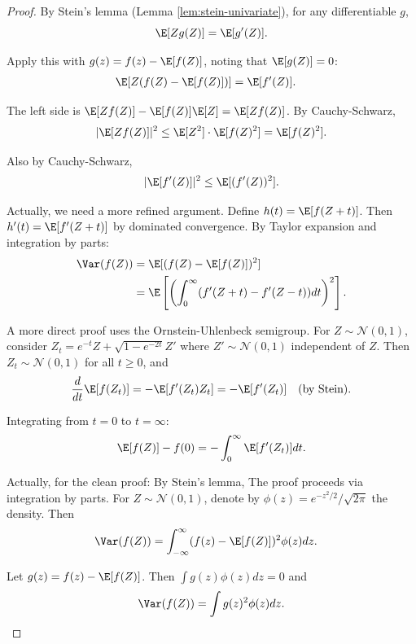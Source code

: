 \begin{proof}
By Stein's lemma (Lemma \ref{lem:stein-univariate}), for any differentiable $g$,
\[
\E[Z g(Z)] = \E[g'(Z)].
\]

Apply this with $g(z) = f(z) - \E[f(Z)]$, noting that $\E[g(Z)] = 0$:
\begin{align}
\E[Z(f(Z) - \E[f(Z)])] &= \E[f'(Z)].
\end{align}

The left side is $\E[Z f(Z)] - \E[f(Z)]\E[Z] = \E[Z f(Z)]$. By Cauchy-Schwarz,
\begin{align}
|\E[Z f(Z)]|^2 \leq \E[Z^2] \cdot \E[f(Z)^2] = \E[f(Z)^2].
\end{align}

Also by Cauchy-Schwarz,
\begin{align}
|\E[f'(Z)]|^2 \leq \E[(f'(Z))^2].
\end{align}

Actually, we need a more refined argument. Define $h(t) = \E[f(Z + t)]$. Then $h'(t) = \E[f'(Z+t)]$ by dominated convergence. By Taylor expansion and integration by parts:
\begin{align}
\Var(f(Z))
&= \E[(f(Z) - \E[f(Z)])^2] \\
&= \E\left[\left(\int_0^\infty (f'(Z + t) - f'(Z - t)) dt\right)^2\right].
\end{align}

A more direct proof uses the Ornstein-Uhlenbeck semigroup. For $Z \sim \mathcal{N}(0,1)$, consider $Z_t = e^{-t} Z + \sqrt{1-e^{-2t}} Z'$ where $Z' \sim \mathcal{N}(0,1)$ independent of $Z$. Then $Z_t \sim \mathcal{N}(0,1)$ for all $t \geq 0$, and
\begin{align}
\frac{d}{dt}\E[f(Z_t)] = -\E[f'(Z_t) Z_t] = -\E[f'(Z_t)] \quad \text{(by Stein)}.
\end{align}

Integrating from $t = 0$ to $t = \infty$:
\begin{align}
\E[f(Z)] - f(0) = -\int_0^\infty \E[f'(Z_t)] dt.
\end{align}

Actually, for the clean proof: By Stein's lemma,
The proof proceeds via integration by parts. For $Z \sim \mathcal{N}(0,1)$, denote by $\phi(z) = e^{-z^2/2}/\sqrt{2\pi}$ the density. Then
\begin{align}
\Var(f(Z))
&= \int_{-\infty}^\infty (f(z) - \E[f(Z)])^2 \phi(z) dz.
\end{align}

Let $g(z) = f(z) - \E[f(Z)]$. Then $\int g(z) \phi(z) dz = 0$ and
\begin{align}
\Var(f(Z)) = \int g(z)^2 \phi(z) dz.
\end{align}


\end{proof}
